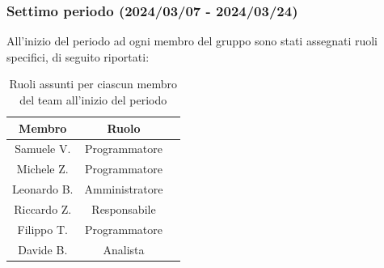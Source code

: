\subsubsection{Settimo periodo (2024/03/07 - 2024/03/24)}



All'inizio del periodo ad ogni membro del gruppo sono stati assegnati ruoli specifici, di seguito riportati:
\begin{table}[H]
\centering
\begin{tabular}{|c|c|c|}
\hline
\textbf{Membro} & \textbf{Ruolo} \\
\hline
Samuele V. & Programmatore \\
\hline
Michele Z. & Programmatore \\
\hline
Leonardo B. & Amministratore \\
\hline
Riccardo Z. & Responsabile \\
\hline
Filippo T. & Programmatore \\
\hline
Davide B. & Analista \\
\hline
\end{tabular}
\caption{Ruoli assunti per ciascun membro del team all'inizio del periodo}
\end{table}

